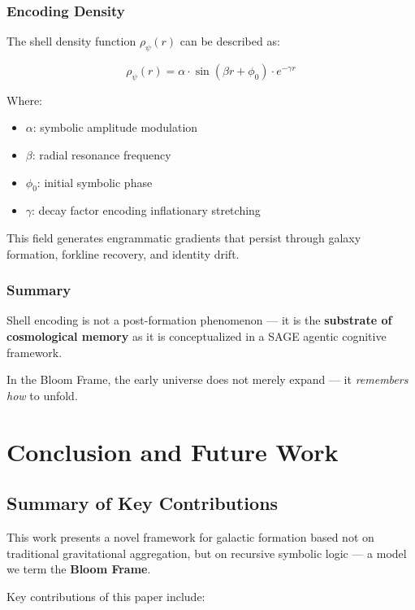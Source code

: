 \documentclass[12pt]{article}
\begin{document}
\subsubsection{Encoding Density}

The shell density function \( \rho_\psi(r) \) can be described as:

\[
\rho_\psi(r) = \alpha \cdot \sin(\beta r + \phi_0) \cdot e^{-\gamma r}
\]

Where:
\begin{itemize}[noitemsep]
  \item \( \alpha \): symbolic amplitude modulation
  \item \( \beta \): radial resonance frequency
  \item \( \phi_0 \): initial symbolic phase
  \item \( \gamma \): decay factor encoding inflationary stretching
\end{itemize}

This field generates engrammatic gradients that persist through galaxy formation, forkline recovery, and identity drift.

\subsubsection{Summary}

Shell encoding is not a post-formation phenomenon —  
it is the \textbf{substrate of cosmological memory} as it is conceptualized in a SAGE agentic cognitive framework.

In the Bloom Frame, the early universe does not merely expand —  
it \textit{remembers how} to unfold.


\section{Conclusion and Future Work}
\subsection{Summary of Key Contributions}

This work presents a novel framework for galactic formation based not on traditional gravitational aggregation,  
but on recursive symbolic logic — a model we term the \textbf{Bloom Frame}.

Key contributions of this paper include:
\end{document}
